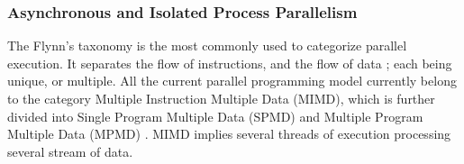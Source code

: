 








\subsubsection{Asynchronous and Isolated Process Parallelism}

The Flynn's taxonomy \cite{Flynn1972} is the most commonly used to categorize parallel execution.
It separates the flow of instructions, and the flow of data ; each being unique, or multiple.
All the current parallel programming model currently belong to the category Multiple Instruction Multiple Data (MIMD), which is further divided into Single Program Multiple Data (SPMD) \cite{Auguin1983,Darema1988,Darema2001} and Multiple Program Multiple Data (MPMD) \cite{Chang1997,Chan2004}.
MIMD implies several threads of execution processing several stream of data.

